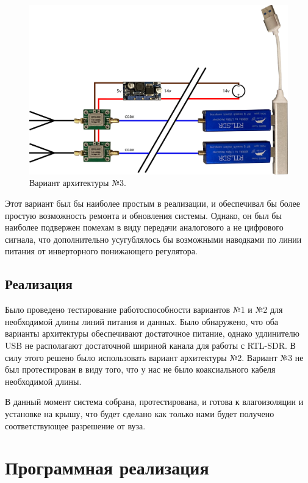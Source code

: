 \documentclass[a4paper, 14pt, titlepage, fleqn]{extarticle}
\begin{document}
	\begin{figure}[H]
		\centering
		\includegraphics[width=\textwidth]{planc.png}
		\caption{Вариант архитектуры №3.}
	\end{figure}
	
	Этот вариант был бы наиболее простым в реализации, и обеспечивал бы более простую возможность ремонта и обновления системы. Однако, он был бы наиболее подвержен помехам в виду передачи аналогового а не цифрового сигнала, что дополнительно усугублялось бы возможными наводками по линии питания от инверторного понижающего регулятора.
	
	\pagebreak
	\subsection*{Реализация}
	
	Было проведено тестирование работоспособности вариантов №1 и №2 для необходимой длины линий питания и данных. Было обнаружено, что оба варианты архитектуры обеспечивают достаточное питание, однако удлинителю USB не располагают достаточной шириной канала для работы с RTL-SDR. В силу этого решено было использовать вариант архитектуры №2. Вариант №3 не был протестирован в виду того, что у нас не было коаксиального кабеля необходимой длины.
	
	В данный момент система собрана, протестирована, и готова к влагоизоляции и установке на крышу, что будет сделано как только нами будет получено соответствующее разрешение от вуза.
	
	\pagebreak
	\section*{Программная реализация}
	
\end{document}
